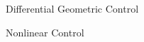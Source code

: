 


\begin{cvitemize}
  \item Differential Geometric Control
  \item Nonlinear Control
  
\end{cvitemize}
